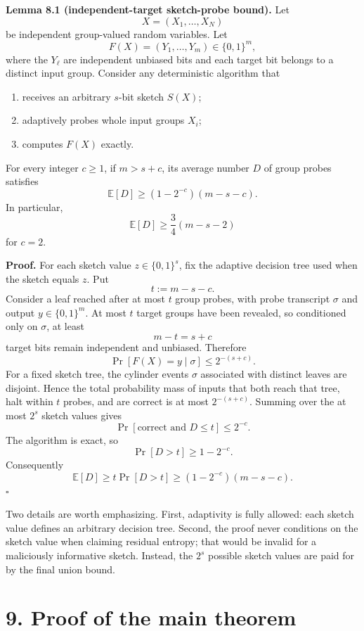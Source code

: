 \documentclass[
]{article}
\providecommand{\tightlist}{%
  \setlength{\itemsep}{0pt}\setlength{\parskip}{0pt}}
\begin{document}
\textbf{Lemma 8.1 (independent-target sketch-probe bound).} Let \[
X=(X_1,\ldots,X_N)
\] be independent group-valued random variables. Let \[
F(X)=(Y_1,\ldots,Y_m)\in\{0,1\}^m,
\] where the \(Y_\ell\) are independent unbiased bits and each target
bit belongs to a distinct input group. Consider any deterministic
algorithm that

\begin{enumerate}
\def\labelenumi{\arabic{enumi}.}
\tightlist
\item
  receives an arbitrary \(s\)-bit sketch \(S(X)\);
\item
  adaptively probes whole input groups \(X_i\);
\item
  computes \(F(X)\) exactly.
\end{enumerate}

For every integer \(c\ge1\), if \(m>s+c\), its average number \(D\) of
group probes satisfies \[
\boxed{
\mathbb E[D]
\ge
(1-2^{-c})(m-s-c).
}
\] In particular, \[
\mathbb E[D]\ge\frac34(m-s-2)
\] for \(c=2\).

\textbf{Proof.} For each sketch value \(z\in\{0,1\}^s\), fix the
adaptive decision tree used when the sketch equals \(z\). Put \[
t:=m-s-c.
\] Consider a leaf reached after at most \(t\) group probes, with probe
transcript \(\sigma\) and output \(y\in\{0,1\}^m\). At most \(t\) target
groups have been revealed, so conditioned only on \(\sigma\), at least
\[
m-t=s+c
\] target bits remain independent and unbiased. Therefore \[
\Pr[F(X)=y\mid\sigma]\le2^{-(s+c)}.
\] For a fixed sketch tree, the cylinder events \(\sigma\) associated
with distinct leaves are disjoint. Hence the total probability mass of
inputs that both reach that tree, halt within \(t\) probes, and are
correct is at most \(2^{-(s+c)}\). Summing over the at most \(2^s\)
sketch values gives \[
\Pr[\text{correct and }D\le t]\le2^{-c}.
\] The algorithm is exact, so \[
\Pr[D>t]\ge1-2^{-c}.
\] Consequently \[
\mathbb E[D]
\ge
t\Pr[D>t]
\ge
(1-2^{-c})(m-s-c).
\] \(\square\)

Two details are worth emphasizing. First, adaptivity is fully allowed:
each sketch value defines an arbitrary decision tree. Second, the proof
never conditions on the sketch value when claiming residual entropy;
that would be invalid for a maliciously informative sketch. Instead, the
\(2^s\) possible sketch values are paid for by the final union bound.

\hypertarget{proof-of-the-main-theorem}{%
\section{9. Proof of the main theorem}\label{proof-of-the-main-theorem}}
\end{document}
